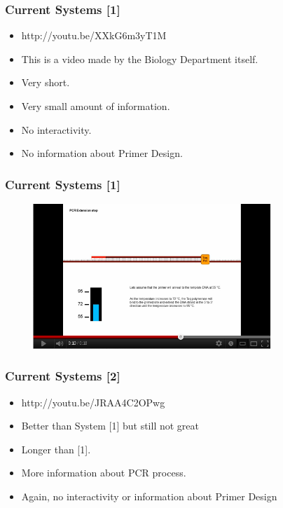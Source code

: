 \begin{frame}
\frametitle{Current Systems [1]}

\begin{itemize}
\item http://youtu.be/XXkG6m3yT1M
\item This is a video made by the Biology Department itself.
\item Very short.
\item Very small amount of information.
\item No interactivity.
\item No information about Primer Design.
\end{itemize}
\end{frame}

\begin{frame}
\frametitle{Current Systems [1]}
\begin{figure}
  \begin{center}
    \includegraphics[width=0.8\textwidth]{./img/currentSystems1.png}
  \end{center}
\end{figure}
\end{frame}

\begin{frame}
\frametitle{Current Systems [2]}
\begin{itemize}
\item http://youtu.be/JRAA4C2OPwg
\item Better than System [1] but still not great
\item Longer than [1].
\item More information about PCR process.
\item Again, no interactivity or information about Primer Design
\end{itemize}
\end{frame}

